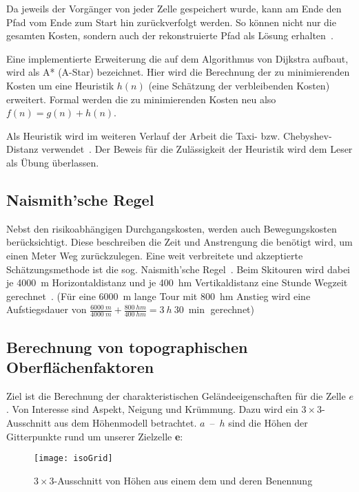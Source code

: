 Da jeweils der Vorgänger von jeder Zelle gespeichert wurde, kann am Ende den Pfad vom Ende zum Start hin zurückverfolgt werden. So können nicht nur die gesamten Kosten, sondern auch der rekonstruierte Pfad als Lösung erhalten~\cite{dijkstra1959note}.

Eine implementierte Erweiterung die auf dem Algorithmus von Dijkstra aufbaut, wird als A* (A-Star) bezeichnet. Hier wird die Berechnung der zu minimierenden Kosten um eine Heuristik $h(n)$ (eine Schätzung der verbleibenden Kosten) erweitert. Formal werden die zu minimierenden Kosten neu also $f(n)=g(n)+h(n)$.~\cite{Hart1968}

Als Heuristik wird im weiteren Verlauf der Arbeit die Taxi- bzw. Chebyshev-Distanz verwendet~\cite{cantrell2000modern}. Der Beweis für die Zulässigkeit der Heuristik wird dem Leser als Übung überlassen. 

\subsection{Naismith'sche Regel}

Nebst den risikoabhängigen Durchgangskosten, werden auch Bewegungskosten berücksichtigt. Diese beschreiben die Zeit und Anstrengung die benötigt wird, um einen Meter Weg zurückzulegen. Eine weit verbreitete und akzeptierte Schätzungsmethode ist die sog. Naismith'sche Regel~\cite{naismithsrule}.
Beim Skitouren wird dabei je \qty{4000}{m} Horizontaldistanz und je \qty{400}{hm} Vertikaldistanz eine Stunde Wegzeit gerechnet~\cite{sacbergspwinter}\cite{naismithsrule}. (Für eine \qty{6000}{m} lange Tour mit \qty{800}{hm} Anstieg wird eine Aufstiegsdauer von $\frac{\qty{6000}{m}}{\qty{4000}{m}} + \frac{\qty{800}{hm}}{\qty{400}{hm}} = \qty{3}{h}\ \qty{30}{\min}$ gerechnet)

\clearpage
\subsection{Berechnung von topographischen Oberflächenfaktoren}
Ziel ist die Berechnung der charakteristischen Geländeeigenschaften für die Zelle $e$.
Von Interesse sind Aspekt, Neigung und Krümmung.
Dazu wird ein $3 \times 3$-Ausschnitt aus dem Höhenmodell betrachtet. 
$a$~--~$h$ sind die Höhen der Gitterpunkte rund um unserer Zielzelle \textbf{e}:

\begin{figure}[H]
  \centering
  \texttt{[image: isoGrid]}
  \caption{$3 \times 3$-Ausschnitt von Höhen aus einem \acrshort{dem} und deren Benennung}
\end{figure}

